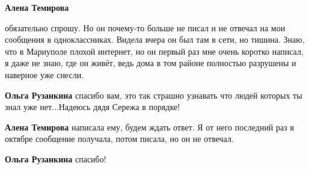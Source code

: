 \begin{multicols}{2}
\begin{itemize}
\begin{itemize}
\textbf{Алена Темирова} 

обязательно спрошу. Но он почему-то больше не писал и не отвечал на мои
сообщения в одноклассниках. Видела вчера он был там в сети, но тишина. Знаю,
что в Мариуполе плохой интернет, но он первый раз мне очень коротко написал, я
даже не знаю, где он живёт, ведь дома в том районе полностью разрушены и
наверное уже снесли.

\textbf{Ольга Рузанкина} спасибо вам, это так страшно узнавать что людей которых ты знал уже нет...Надеюсь дядя Сережа в порядке!

\textbf{Алена Темирова} написала ему, будем ждать ответ. Я от него последний раз в октябре сообщение получала, потом писала, но он не отвечал.

\textbf{Ольга Рузанкина} спасибо!
\end{itemize} %


\end{itemize} %

\end{multicols} %
